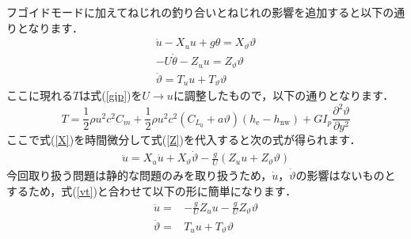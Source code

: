 \documentclass{jarticle}
\begin{document}
フゴイドモードに加えてねじれの釣り合いとねじれの影響を追加すると以下の通りとなります．
\begin{align} 
    \dot{u} - X_u u + g \theta = X_\vartheta \vartheta \label{X}\\
    -U\dot{\theta} - Z_u u = Z_\vartheta \vartheta \label{Z} \\
    \ddot{\vartheta} = T_u u + T_\vartheta \vartheta \label{vt}
\end{align}
ここに現れる$T$は式(\ref{gip})を$U \rightarrow u$に調整したもので，以下の通りとなります．
\begin{equation}
    T = \frac{1}{2}\rho u^2 c^2 C_m + \frac{1}{2}\rho u^2 c^2 (C_{L_0} + a\vartheta)  (h_\mathrm{e}-h_\mathrm{nw}) + GI_p \frac{\partial^2 \vartheta}{\partial y^2}
\end{equation}
ここで式(\ref{X})を時間微分して式(\ref{Z})を代入すると次の式が得られます．
\begin{align}
    \ddot{u} = X_u \dot{u} + X_\vartheta \dot{\vartheta} - \frac{g}{U} (Z_u u + Z_\vartheta \vartheta) 
\end{align}
今回取り扱う問題は静的な問題のみを取り扱うため，$\dot{u}，\dot{\vartheta}$の影響はないものとするため，式(\ref{vt})と合わせて以下の形に簡単になります．
\begin{align}
    \ddot{u} =&  - \frac{g}{U}Z_u u - \frac{g}{U}Z_\vartheta \vartheta \\
    \ddot{\vartheta} =& T_u u + T_\vartheta \vartheta
\end{align}
\end{document}
